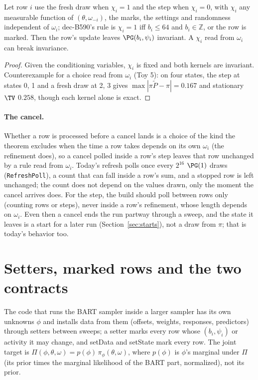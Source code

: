 \begin{theorem}\label{thm:rule}
Let row $i$ use the fresh draw when $\chi_i=1$ and the step when $\chi_i=0$, with $\chi_i$ any measurable function
of $(\theta,\omega_{-i})$, the marks, the settings and randomness independent of $\omega_i$; dec-B590's rule is
$\chi_i=1$ iff $b_i\le64$ and $b_i\in\mathbb Z$, or the row is marked. Then the row's update leaves
$\PG(b_i,\psi_i)$ invariant. A $\chi_i$ read from $\omega_i$ can break invariance.
\end{theorem}
\begin{proof}
Given the conditioning variables, $\chi_i$ is fixed and both kernels are invariant. Counterexample for a choice
read from $\omega_i$ (Toy 5): on four states, the step at states 0, 1 and a fresh draw at 2, 3 gives
$\max|\pi\widetilde P-\pi|=0.167$ and stationary $\TV$ $0.258$, though each kernel alone is exact.
\end{proof}

\paragraph{The cancel.} Whether a row is processed before a cancel lands is a choice of the kind the theorem
excludes when the time a row takes depends on its own $\omega_i$ (the refinement does), so a cancel polled inside a
row's step leaves that row unchanged by a rule read from $\omega_i$. Today's refresh polls once every $2^{16}$
$\PG(1)$ draws (\texttt{RefreshPoll}), a count that can fall inside a row's sum, and a stopped row is left
unchanged; the count does not depend on the values drawn, only the moment the cancel arrives does. For the step,
the build should poll between rows only (counting rows or steps), never inside a row's refinement, whose length
depends on $\omega_i$. Even
then a cancel ends the run partway through a sweep, and the state it leaves is a start for a later run
(Section~\ref{sec:starts}), not a draw from $\pi$; that is today's behavior too.

\section{Setters, marked rows and the two contracts}\label{sec:setters}

The code that runs the BART sampler inside a larger sampler has its own unknowns $\phi$ and installs data from them
(offsets, weights, responses, predictors) through setters between sweeps; a setter marks every row whose
$(b_i,\psi_i)$ or activity it may change, and setData and setState mark every row. The joint target is
$\Pi(\phi,\theta,\omega)=p(\phi)\,\pi_\phi(\theta,\omega)$, where $p(\phi)$ is $\phi$'s marginal under $\Pi$ (its
prior times the marginal likelihood of the BART part, normalized), not its prior.


